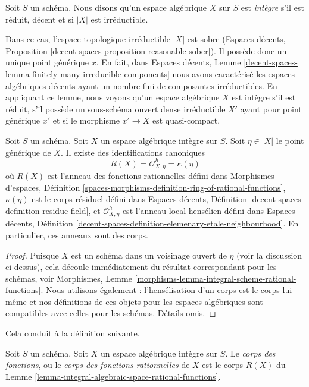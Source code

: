 \begin{definition}
\label{definition-integral-algebraic-space}
Soit $S$ un schéma. Nous disons qu'un espace algébrique $X$ sur $S$ est
{\it intègre} s'il est réduit, décent et si $|X|$ est irréductible.
\end{definition}

\noindent
Dans ce cas, l'espace topologique irréductible $|X|$ est sobre
(Espaces décents, Proposition \ref{decent-spaces-proposition-reasonable-sober}).
Il possède donc un unique point générique $x$. En fait, dans
Espaces décents, Lemme
\ref{decent-spaces-lemma-finitely-many-irreducible-components}
nous avons caractérisé les espaces algébriques décents ayant un nombre fini de
composantes irréductibles. En appliquant ce lemme, nous voyons qu'un
espace algébrique $X$ est intègre s'il est
réduit, s'il possède un sous-schéma ouvert dense irréductible $X'$
ayant pour point générique $x'$ et si le morphisme $x' \to X$ est quasi-compact.

\begin{lemma}
\label{lemma-integral-algebraic-space-rational-functions}
Soit $S$ un schéma. Soit $X$ un espace algébrique intègre sur $S$.
Soit $\eta \in |X|$ le point générique de $X$.
Il existe des identifications canoniques
$$
R(X) = \mathcal{O}_{X, \eta}^h = \kappa(\eta)
$$
où $R(X)$ est l'anneau des fonctions rationnelles défini dans
Morphismes d'espaces, Définition
\ref{spaces-morphisms-definition-ring-of-rational-functions},
$\kappa(\eta)$ est le corps résiduel défini dans
Espaces décents, Définition \ref{decent-spaces-definition-residue-field},
et $\mathcal{O}_{X, \eta}^h$ est l'anneau local hensélien défini dans
Espaces décents, Définition
\ref{decent-spaces-definition-elemenary-etale-neighbourhood}.
En particulier, ces anneaux sont des corps.
\end{lemma}

\begin{proof}
Puisque $X$ est un schéma dans un voisinage ouvert de $\eta$ (voir la discussion
ci-dessus), cela découle immédiatement du résultat correspondant pour
les schémas, voir Morphismes, Lemme
\ref{morphisms-lemma-integral-scheme-rational-functions}.
Nous utilisons également : l'hensélisation d'un corps est le corps lui-même
et nos définitions de ces objets
pour les espaces algébriques sont compatibles avec celles pour les schémas.
Détails omis.
\end{proof}

\noindent
Cela conduit à la définition suivante.

\begin{definition}
\label{definition-function-field}
Soit $S$ un schéma. Soit $X$ un espace algébrique intègre sur $S$.
Le {\it corps des fonctions}, ou le {\it corps des fonctions rationnelles}
de $X$ est le corps $R(X)$ du
Lemme \ref{lemma-integral-algebraic-space-rational-functions}.
\end{definition}

